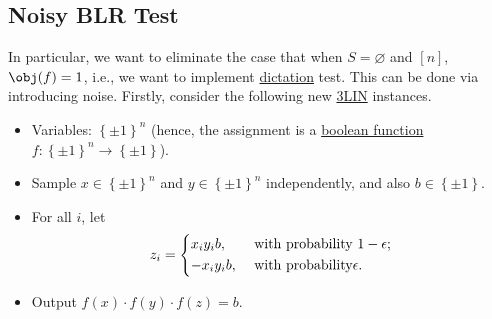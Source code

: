 \subsection{Noisy BLR Test}
In particular, we want to eliminate the case that when \(S = \varnothing \) and \([n]\), \(\obj(f) = 1\), i.e., we want to implement \hyperref[def:dictation]{dictation} test. This can be done via introducing noise. Firstly, consider the following new \hyperref[prb:max-3LIN]{3LIN} instances.

\begin{itemize}
	\item Variables: \(\left\{ \pm 1 \right\} ^n\) (hence, the assignment is a \hyperref[def:boolean-function]{boolean function} \(f\colon \left\{ \pm 1 \right\} ^n \to  \left\{ \pm 1 \right\} \)).
	\item Sample \(x\in \left\{ \pm 1 \right\} ^n\) and \(y\in \left\{ \pm 1 \right\} ^n\) independently, and also \(b\in \left\{ \pm 1 \right\} \).
	\item For all \(i\), let
	      \[
		      z_i = \begin{dcases}
			      x_i y_i b,  & \text{ with probability } 1-\epsilon  ; \\
			      -x_i y_i b, & \text{ with probability} \epsilon  .
		      \end{dcases}
	      \]
	\item Output \(f(x) \cdot f(y)\cdot f(z) = b\).
\end{itemize}

